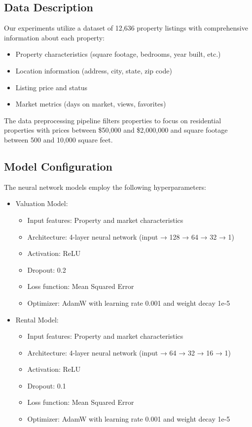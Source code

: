 \documentclass[conference]{IEEEtran}
\begin{document}
\subsection{Data Description}
Our experiments utilize a dataset of 12,636 property listings with comprehensive information about each property:

\begin{itemize}
\item Property characteristics (square footage, bedrooms, year built, etc.)
\item Location information (address, city, state, zip code)
\item Listing price and status
\item Market metrics (days on market, views, favorites)
\end{itemize}

The data preprocessing pipeline filters properties to focus on residential properties with prices between \$50,000 and \$2,000,000 and square footage between 500 and 10,000 square feet.

\subsection{Model Configuration}
The neural network models employ the following hyperparameters:

\begin{itemize}
\item Valuation Model:
  \begin{itemize}
  \item Input features: Property and market characteristics
  \item Architecture: 4-layer neural network (input → 128 → 64 → 32 → 1)
  \item Activation: ReLU
  \item Dropout: 0.2
  \item Loss function: Mean Squared Error
  \item Optimizer: AdamW with learning rate 0.001 and weight decay 1e-5
  \end{itemize}
\item Rental Model:
  \begin{itemize}
  \item Input features: Property and market characteristics
  \item Architecture: 4-layer neural network (input → 64 → 32 → 16 → 1)
  \item Activation: ReLU
  \item Dropout: 0.1
  \item Loss function: Mean Squared Error
  \item Optimizer: AdamW with learning rate 0.001 and weight decay 1e-5
  \end{itemize}
\end{itemize}
\end{document}
